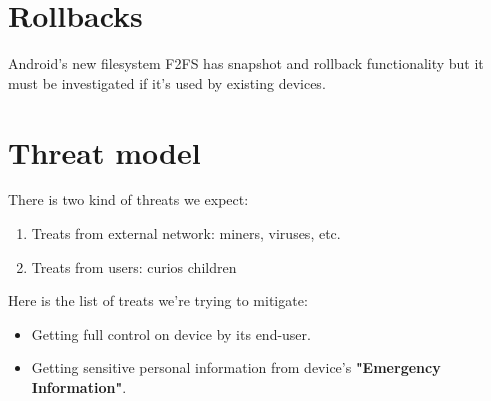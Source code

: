 \section{Rollbacks}

Android's new filesystem F2FS has snapshot and rollback functionality
but it must be investigated if it's used by existing devices.


\section{Threat model}

There is two kind of threats we expect:

\begin{enumerate}
\item Treats from external network: miners, viruses, etc.
\item Treats from users: curios children
\end{enumerate}

Here is the list of treats we're trying to mitigate:

\begin{itemize}
\item Getting full control on device by its end-user.
\item Getting sensitive personal information from device's
\textbf{"Emergency Information"}.
\end{itemize}

